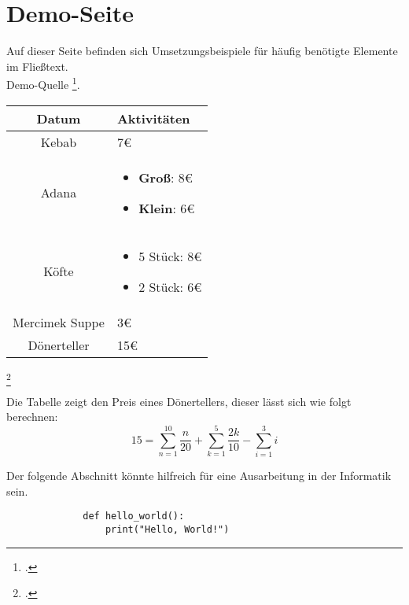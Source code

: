 \section{Demo-Seite}
Auf dieser Seite befinden sich Umsetzungsbeispiele für häufig benötigte Elemente im Fließtext.\\
Demo-Quelle \footcite[Vgl.][]{DemoQuelle}.

\begin{center}
    \begin{table}[h]
    \centering
    \begin{tabular}{|c|p{6cm}|}
        \hline
        \textbf{Datum} & \textbf{Aktivitäten} \\
        \hline
        Kebab & 7€ \\
        \hline
        Adana & \begin{itemize}
            \item \textbf{Groß}: 8€
            \item \textbf{Klein}: 6€
        \end{itemize} \\
        \hline
        Köfte & \begin{itemize}
            \item 5 Stück: 8€
            \item 2 Stück: 6€
        \end{itemize}\\
        \hline
        Mercimek Suppe & 3€ \\
        \hline
        Dönerteller & 15€ \\
        \hline
    \end{tabular}
    \label{tab:example}
    \end{table}
\end{center}
\footcitetext[Vgl.][]{DemoQuelle}

Die Tabelle zeigt den Preis eines Dönertellers, dieser lässt sich wie folgt berechnen:
\begin{equation}
    15 = \sum_{n=1}^{10} \frac{n}{20} + \sum_{k=1}^{5} \frac{2k}{10} - \sum_{i=1}^{3} i
\end{equation}

\newpage
Der folgende Abschnitt könnte hilfreich für eine Ausarbeitung in der Informatik sein.
\begin{figure}[h]
    \begin{lstlisting}
        def hello_world():
            print("Hello, World!")
    \end{lstlisting}
    \label{fig:meincode}
\end{figure}

